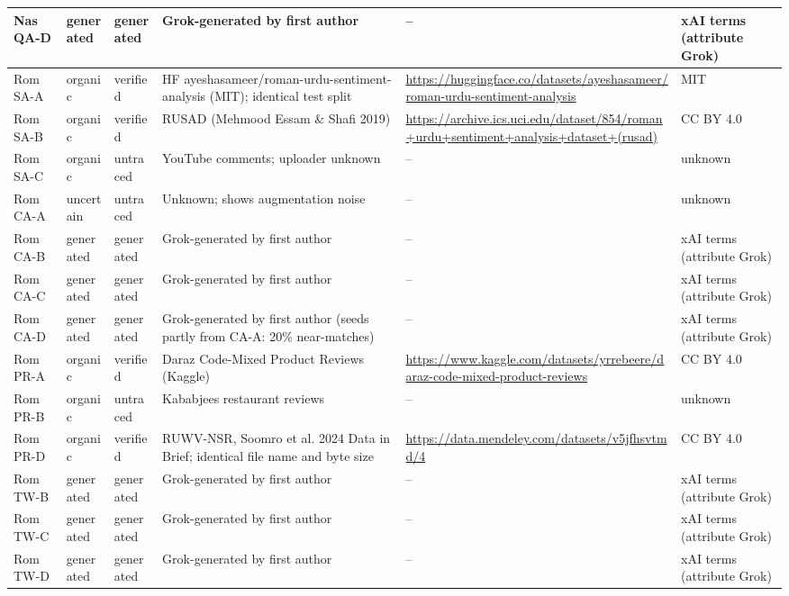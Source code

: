 \begin{tabular}{llp{1.3cm}p{5.0cm}p{5.6cm}p{2.4cm}}
Nas QA-D & generated & generated & Grok-generated by first author & -- & xAI terms (attribute Grok) \\
\midrule
Rom SA-A & organic & verified & HF ayeshasameer/roman-urdu-sentiment-analysis (MIT); identical test split \citep{ayeshasameer2024romanurdu} & \url{https://huggingface.co/datasets/ayeshasameer/roman-urdu-sentiment-analysis} & MIT \\
Rom SA-B & organic & verified & RUSAD (Mehmood Essam \& Shafi 2019) \citep{mehmood2019rusad} & \url{https://archive.ics.uci.edu/dataset/854/roman+urdu+sentiment+analysis+dataset+(rusad)} & CC BY 4.0 \\
Rom SA-C & organic & untraced & YouTube comments; uploader unknown & -- & unknown \\
Rom CA-A & uncertain & untraced & Unknown; shows augmentation noise & -- & unknown \\
Rom CA-B & generated & generated & Grok-generated by first author & -- & xAI terms (attribute Grok) \\
Rom CA-C & generated & generated & Grok-generated by first author & -- & xAI terms (attribute Grok) \\
Rom CA-D & generated & generated & Grok-generated by first author (seeds partly from CA-A: 20\% near-matches) & -- & xAI terms (attribute Grok) \\
Rom PR-A & organic & verified & Daraz Code-Mixed Product Reviews (Kaggle) \citep{daraz2023kaggle} & \url{https://www.kaggle.com/datasets/yrrebeere/daraz-code-mixed-product-reviews} & CC BY 4.0 \\
Rom PR-B & organic & untraced & Kababjees restaurant reviews & -- & unknown \\
Rom PR-D & organic & verified & RUWV-NSR, Soomro et al. 2024 Data in Brief; identical file name and byte size \citep{soomro2024ruwv} & \url{https://data.mendeley.com/datasets/v5jfhsvtmd/4} & CC BY 4.0 \\
Rom TW-B & generated & generated & Grok-generated by first author & -- & xAI terms (attribute Grok) \\
Rom TW-C & generated & generated & Grok-generated by first author & -- & xAI terms (attribute Grok) \\
Rom TW-D & generated & generated & Grok-generated by first author & -- & xAI terms (attribute Grok) \\
\bottomrule
\end{tabular}
